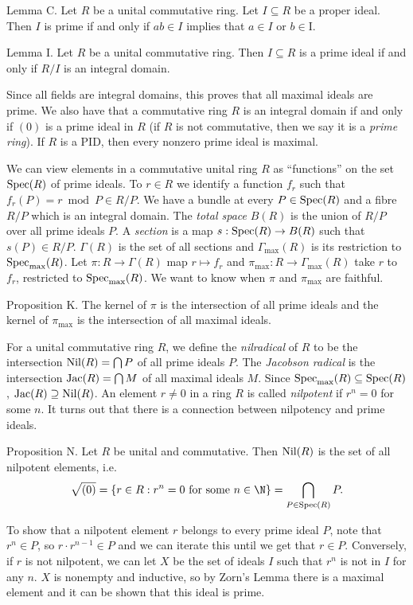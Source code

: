 \proclaim Lemma C. Let $R$ be a unital commutative ring. Let $I\subseteq R$ be a proper ideal. Then $I$ is prime if and only if $ab\in I$ implies that $a\in I$ or $b\in $I.\slug

\proclaim Lemma I. Let $R$ be a unital commutative ring. Then $I\subseteq R$ is a prime ideal if and only if $R/I$ is an integral domain.\slug

Since all fields are integral domains, this proves that all maximal ideals are prime. We also have that a commutative ring $R$ is an integral domain if and only if $(0)$ is a prime ideal in $R$ (if $R$ is not commutative, then we say it is a {\it prime ring}). If $R$ is a PID, then every nonzero prime ideal is maximal.

We can view elements in a commutative unital ring $R$ as ``functions'' on the set $\mathop {\rm Spec}(R)$ of prime ideals. To $r\in R$ we identify a function $f_r$ such that $f_r(P) = r \bmod P\in R/P$. We have a bundle at every $P\in \mathop {\rm Spec}(R)$ and a fibre $R/P$ which is an integral domain. The {\it total space} $B(R)$ is the union of $R/P$ over all prime ideals $P$. A {\it section} is a map $s: \mathop {\rm Spec}(R)\to B(R)$ such that $s(P)\in R/P$. $\Gamma(R)$ is the set of all sections and $\Gamma_{\max}(R)$ is its restriction to $\mathop {\rm Spec}_{\max}(R)$. Let $\pi : R\to \Gamma(R)$ map $r\mapsto f_r$ and $\pi_{\max} : R\to \Gamma_{\max}(R)$ take $r$ to $f_r$, restricted to $\mathop {\rm Spec}_{\max}(R)$. We want to know when $\pi$ and $\pi_{\max}$ are faithful.

\proclaim Proposition K. The kernel of $\pi$ is the intersection of all prime ideals and the kernel of $\pi_{\max}$ is the intersection of all maximal ideals.\slug

For a unital commutative ring $R$, we define the {\it nilradical} of $R$ to be the intersection $\mathop {\rm Nil}(R) = \bigcap P$ of all prime ideals $P$. The {\it Jacobson radical} is the intersection $\mathop {\rm Jac}(R) = \bigcap M$ of all maximal ideals $M$. Since $\mathop {\rm Spec}_{\max}(R) \subseteq \mathop {\rm Spec}(R)$, $\mathop {\rm Jac}(R) \supseteq \mathop {\rm Nil}(R)$. An element $r\neq 0$ in a ring $R$ is called {\it nilpotent} if $r^n = 0$ for some $n$. It turns out that there is a connection between nilpotency and prime ideals.

\proclaim Proposition N. Let $R$ be unital and commutative. Then $\mathop {\rm Nil}(R)$ is the set of all nilpotent elements, i.e.
$$\sqrt{(0)} = \{r\in R : r^n = 0\ \hbox{for some}\ n\in \N\} = \bigcap_{P\in \Spec(R)} P.$$

\proof To show that a nilpotent element $r$ belongs to every prime ideal $P$, note that $r^n \in P$, so $r\cdot r^{n-1}\in P$ and we can iterate this until we get that $r\in P$. Conversely, if $r$ is not nilpotent, we can let $X$ be the set of ideals $I$ such that $r^n$ is not in $I$ for any $n$. $X$ is nonempty and inductive, so by Zorn's Lemma there is a maximal element and it can be shown that this ideal is prime.\slug

